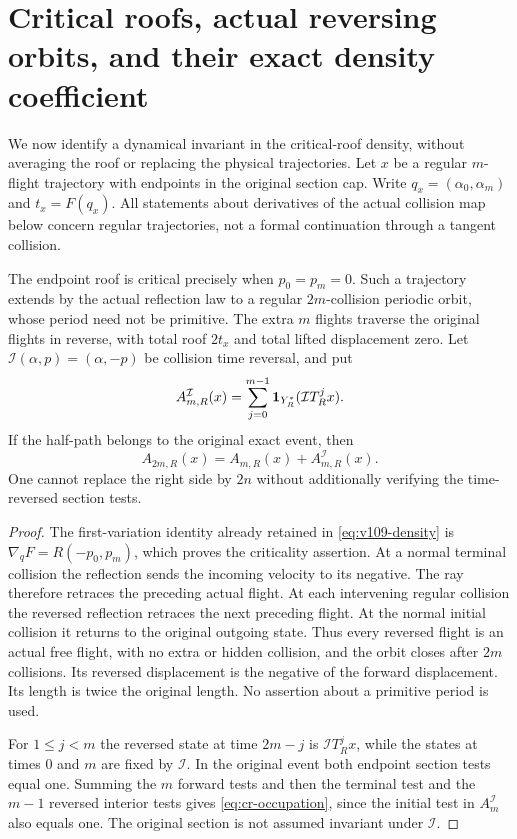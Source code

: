 \section{Critical roofs, actual reversing orbits, and their exact density coefficient}
\label{sec:cr-critical}
We now identify a dynamical invariant in the critical-roof density,
without averaging the roof or replacing the physical trajectories.
Let $x$ be a regular $m$-flight trajectory with endpoints in the
original section cap. Write $q_x=(\alpha_0,\alpha_m)$ and
$t_x=F(q_x)$. All statements about derivatives of the actual
collision map below concern regular trajectories, not a formal
continuation through a tangent collision.

\begin{theorem}
\label{thm:cr-periodic}
The endpoint roof is critical precisely when $p_0=p_m=0$.
Such a trajectory extends by the actual reflection law to a regular
$2m$-collision periodic orbit, whose period need not be primitive.
The extra $m$ flights traverse the original flights in reverse,
with total roof $2t_x$ and total lifted displacement zero.
Let $\mathcal I(\alpha,p)=(\alpha,-p)$ be collision time reversal,
and put
\[
 A^\mathcal I_{m,R}(x)
       =\sum_{j=0}^{m-1}\mathbf1_{Y_R^*}(\mathcal I T_R^j x).
\]
If the half-path belongs to the original exact event, then
\begin{equation}\label{eq:cr-occupation}
 A_{2m,R}(x)=A_{m,R}(x)+A^\mathcal I_{m,R}(x).
\end{equation}
One cannot replace the right side by $2n$ without additionally
verifying the time-reversed section tests.
\end{theorem}
\begin{proof}
The first-variation identity already retained in
\eqref{eq:v109-density} is $\nabla_qF=R(-p_0,p_m)$, which proves
the criticality assertion. At a normal terminal collision the
reflection sends the incoming velocity to its negative. The ray
therefore retraces the preceding actual flight. At each intervening
regular collision the reversed reflection retraces the next
preceding flight. At the normal initial collision it returns to the
original outgoing state. Thus every reversed flight is an actual
free flight, with no extra or hidden collision, and the orbit closes
after $2m$ collisions. Its reversed displacement is the negative of
the forward displacement. Its length is twice the original length.
No assertion about a primitive period is used.

For $1\le j<m$ the reversed state at time $2m-j$ is
$\mathcal I T_R^j x$, while the states at times $0$ and $m$ are
fixed by $\mathcal I$. In the original event both endpoint section
tests equal one. Summing the $m$ forward tests and then the terminal
test and the $m-1$ reversed interior tests gives
\eqref{eq:cr-occupation}, since the initial test in
$A^\mathcal I_m$ also equals one. The original section is not
assumed invariant under $\mathcal I$.
\end{proof}

